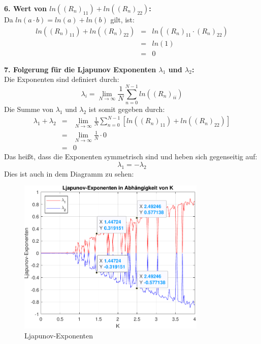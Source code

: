 \documentclass[paper=a4, 
                DIV=12]{scrartcl}
\begin{document}
\noindent\textbf{6. Wert von $ln((R_n)_{11}) + ln((R_n)_{22})$:} \\
Da $ln(a \cdot b) = ln(a) + ln(b)$ gilt, ist:
\begin{eqnarray*}
    ln((R_n)_{11}) + ln((R_n)_{22}) &=& ln((R_n)_{11} \cdot (R_n)_{22}) \\
    &=& ln(1) \\
    &=& 0
\end{eqnarray*}

\newpage
\noindent\textbf{7. Folgerung für die Ljapunov Exponenten $\lambda_1$ und $\lambda_2$:} \\
Die Exponenten sind definiert durch: 
$$ \lambda_i = \lim_{N\to\infty}\frac{1}{N}\sum_{n=0}^{N-1}ln((R_n)_{ii}) $$
Die Summe von $\lambda_1$ und $\lambda_2$ ist somit gegeben durch:
\begin{eqnarray*}
    \lambda_1 + \lambda_2 &=& \lim_{N\to\infty}\frac{1}{N}\sum_{n=0}^{N-1}[ln((R_n)_{11}) + ln((R_n)_{22})] \\
    &=& \lim_{N\to\infty}\frac{1}{N}\cdot 0 \\
    &=& 0
\end{eqnarray*}
Das heißt, dass die Exponenten symmetrisch sind und heben sich gegenseitig auf:
$$ \lambda_1 = -\lambda_2 $$
Dies ist auch in dem Diagramm zu sehen:
\begin{figure}[H]
    \centering
    \includegraphics[width=0.8\textwidth]{figures/exponenten_data.pdf}
    \caption{Ljapunov-Exponenten}
\end{figure}
\end{document}
